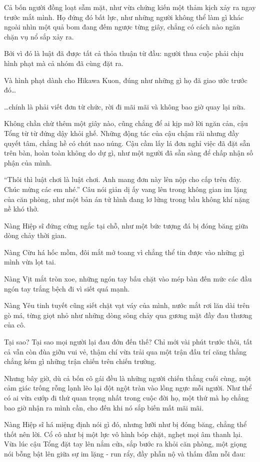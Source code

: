 \documentclass[../main.tex]{subfiles}
\begin{document}
Cả bốn người đồng loạt sẫm mặt, như vừa chứng kiến một thảm kịch xảy ra ngay trước mắt mình. Họ đứng đó bất lực, như những người không thể làm gì khác ngoài nhìn một quả bom đang đếm ngược từng giây, chẳng có cách nào ngăn chặn vụ nổ sắp xảy ra.

Bởi vì đó là luật đã được tất cả thỏa thuận từ đầu: người thua cuộc phải chịu hình phạt mà cả nhóm đã cùng đặt ra.

Và hình phạt dành cho Hikawa Kuon, đúng như những gì họ đã giao ước trước đó\dots

\dots chính là phải viết đơn từ chức, rời đi mãi mãi và không bao giờ quay lại nữa.

Không chần chừ thêm một giây nào, cũng chẳng để ai kịp mở lời ngăn cản, cậu Tổng từ từ đứng dậy khỏi ghế. Những động tác của cậu chậm rãi nhưng đầy quyết tâm, chẳng hề có chút nao núng. Cậu cầm lấy lá đơn nghỉ việc đã đặt sẵn trên bàn, hoàn toàn không do dự gì, như một người đã sẵn sàng để chấp nhận số phận của mình.

``Thôi thì luật chơi là luật chơi. Anh mang đơn này lên nộp cho cấp trên đây. Chúc mừng các em nhé.'' Câu nói giản dị ấy vang lên trong không gian im lặng của căn phòng, như một bản án tử hình đang lơ lửng trong bầu không khí nặng nề khó thở.

Nàng Hiệp sĩ đứng cứng ngắc tại chỗ, như một bức tượng đá bị đóng băng giữa dòng chảy thời gian.

Nàng Cừu há hốc mồm, đôi mắt mở toang vì chẳng thể tin được vào những gì mình vừa lọt tai.

Nàng Vịt mắt tròn xoe, những ngón tay bấu chặt vào mép bàn đến mức các đầu ngón tay trắng bệch đi vì siết quá mạnh.

Nàng Yêu tinh tuyết cũng siết chặt vạt váy của mình, nước mắt rơi lăn dài trên gò má, từng giọt nhỏ như những dòng sông chảy qua gương mặt đầy đau thương của cô.

Tại sao? Tại sao mọi người lại đau đớn đến thế? Chỉ mới vài phút trước thôi, tất cả vẫn còn đùa giỡn vui vẻ, thậm chí vừa trải qua một trận đấu trí căng thẳng chẳng kém gì những trận chiến trên chiến trường.

Nhưng bây giờ, dù cả bốn cô gái đều là những người chiến thắng cuối cùng, một cảm giác trống rỗng lạnh lẽo lại đột ngột tràn vào lồng ngực mỗi người. Như thể có ai vừa cướp đi thứ quan trọng nhất trong cuộc đời họ, một thứ mà họ chẳng bao giờ nhận ra mình cần, cho đến khi nó sắp biến mất mãi mãi.

Nàng Hiệp sĩ há miệng định nói gì đó, nhưng lưỡi như bị đóng băng, chẳng thể thốt nên lời. Cổ cô như bị một lực vô hình bóp chặt, nghẹt mọi âm thanh lại. Vừa lúc cậu Tổng đặt tay lên nắm cửa, sắp bước ra khỏi căn phòng, một giọng nói bỗng bật lên giữa sự im lặng - run rẩy, đầy phẫn nộ và thấm đẫm nỗi đau:
\end{document}

